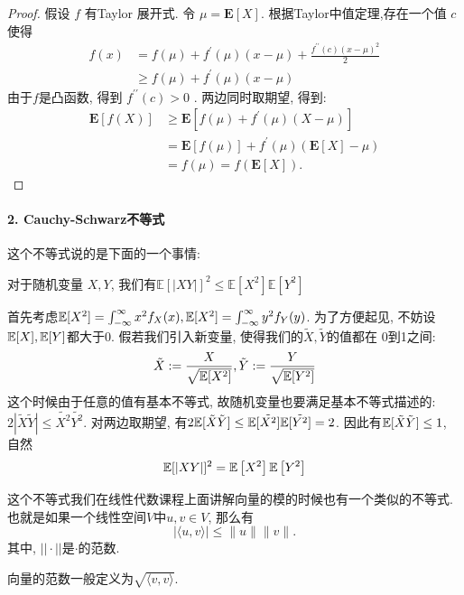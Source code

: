 \begin{proof}
    假设 $f$ 有Taylor 展开式. 令 $\mu=\mathbf{E}[X]$. 根据Taylor中值定理,存在一个值 $c$ 使得
$$
\begin{aligned}
f(x) & =f(\mu)+f^{\prime}(\mu)(x-\mu)+\frac{f^{\prime \prime}(c)(x-\mu)^2}{2} \\
& \geq f(\mu)+f^{\prime}(\mu)(x-\mu)
\end{aligned}
$$
由于$f$是凸函数, 得到 $f^{\prime \prime}(c)>0$ . 两边同时取期望, 得到: 
$$
\begin{aligned}
\mathbf{E}[f(X)] & \geq \mathbf{E}\left[f(\mu)+f^{\prime}(\mu)(X-\mu)\right] \\
& =\mathbf{E}[f(\mu)]+f^{\prime}(\mu)(\mathbf{E}[X]-\mu) \\
& =f(\mu)=f(\mathbf{E}[X]) .
\end{aligned}
$$
\end{proof}

\paragraph{2. Cauchy-Schwarz不等式}
这个不等式说的是下面的一个事情: 


对于随机变量  $ X, Y $, 我们有$ \mathbb{E}[|X Y|]^2 \leqslant \mathbb{E}\left[X^2\right] \mathbb{E}\left[Y^2\right]$
    
  
    
    首先考虑$\mathbb E[X^2] = \int_{-\infty}^{\infty} x^2 f_X(x), \mathbb E[X^2] = \int_{-\infty}^{\infty} y^2 f_Y(y)$. 为了方便起见, 不妨设$\mathbb E[X], \mathbb E[Y]$都大于0. 假若我们引入新变量, 使得我们的$\tilde{X}, \tilde{Y}$的值都在 0到1之间: 
    $$
    \tilde{X}:= \frac{X}{\sqrt{\mathbb E[X^2]}},\tilde{Y}:= \frac{Y}{\sqrt{\mathbb E[Y^2]}} 
    $$
    这个时候由于任意的值有基本不等式, 故随机变量也要满足基本不等式描述的: $2|\tilde{X}\tilde{Y}|\leq \tilde{X^2}\tilde{Y^2}$. 对两边取期望, 有$2\mathbb E[\tilde{X}\tilde{Y}]\leq \mathbb E[\tilde{X^2}]\mathbb E[\tilde{Y^2}]=2$. 因此有$\mathbb E[\tilde{X}\tilde{Y}]\leq 1$, 自然
    $$
        \mathbb E[|X Y|]^2 = \mathbb{E}\left[X^2\right] \mathbb{E}\left[Y^2\right]
    $$ 

    \begin{asidebox}
        这个不等式我们在线性代数课程上面讲解向量的模的时候也有一个类似的不等式. 也就是如果一个线性空间$V$中$u,v\in V$, 那么有
        $$
        |\langle u, v\rangle| \leq\|u\|\|v\|.
        $$
        其中, $||\cdot||$是$\cdot$的范数. 

        向量的范数一般定义为$\sqrt{\langle v, v\rangle}$. 
    \end{asidebox}

